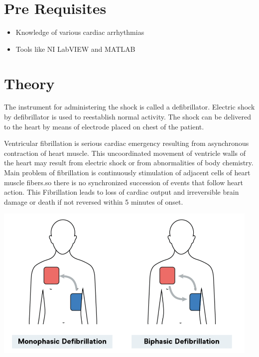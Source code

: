 \documentclass[
  11pt,
  letterpaper,
  DIV=11,
  numbers=noendperiod]{scrreprt}
\providecommand{\tightlist}{%
  \setlength{\itemsep}{0pt}\setlength{\parskip}{0pt}}\usepackage{longtable,booktabs,array}
\begin{document}
\section{Pre Requisites}\label{pre-requisites-2}

\begin{itemize}
\tightlist
\item
  Knowledge of various cardiac arrhythmias
\item
  Tools like NI LabVIEW and MATLAB
\end{itemize}

\section{Theory}\label{theory-7}

The instrument for administering the shock is called a defibrillator.
Electric shock by defibrillator is used to reestablish normal activity.
The shock can be delivered to the heart by means of electrode placed on
chest of the patient.

Ventricular fibrillation is serious cardiac emergency resulting from
asynchronous contraction of heart muscle. This uncoordinated movement of
ventricle walls of the heart may result from electric shock or from
abnormalities of body chemistry. Main problem of fibrillation is
continuously stimulation of adjacent cells of heart muscle fibers.so
there is no synchronized succession of events that follow heart action.
This Fibrillation leads to loss of cardiac output and irreversible brain
damage or death if not reversed within 5 minutes of onset.

\begin{center}
\includegraphics[width=5.03125in,height=\textheight]{images/clipboard-1102124754.png}
\end{center}
\end{document}
